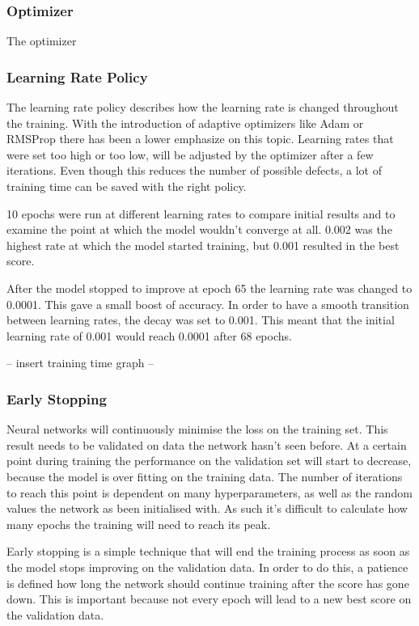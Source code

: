 \subsubsection{Optimizer}

The optimizer 

\subsubsection{Learning Rate Policy}

The learning rate policy describes how the learning rate is changed throughout the training. With the introduction of adaptive optimizers like Adam or RMSProp there has been a lower emphasize on this topic. Learning rates that were set too high or too low, will be adjusted by the optimizer after a few iterations. Even though this reduces the number of possible defects, a lot of training time can be saved with the right policy.

10 epochs were run at different learning rates to compare initial results and to examine the point at which the model wouldn't converge at all. 0.002 was the highest rate at which the model started training, but 0.001 resulted in the best score.

After the model stopped to improve at epoch 65 the learning rate was changed to 0.0001. This gave a small boost of accuracy. In order to have a smooth transition between learning rates, the decay was set to 0.001. This meant that the initial learning rate of 0.001 would reach 0.0001 after 68 epochs.

-- insert training time graph --

\subsubsection{Early Stopping}

Neural networks will continuously minimise the loss on the training set. This result needs to be validated on data the network hasn't seen before. At a certain point during training the performance on the validation set will start to decrease, because the model is over fitting on the training data. The number of iterations to reach this point is dependent on many hyperparameters, as well as the random values the network as been initialised with. As such it's difficult to calculate how many epochs the training will need to reach its peak.

Early stopping is a simple technique that will end the training process as soon as the model stops improving on the validation data. In order to do this, a patience is defined how long the network should continue training after the score has gone down. This is important because not every epoch will lead to a new best score on the validation data.

